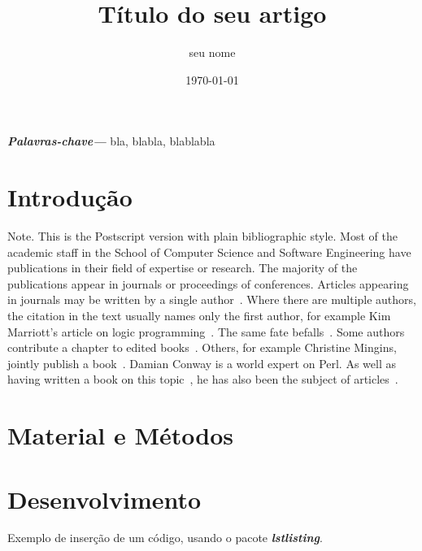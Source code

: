 \documentclass{article}
\title{Título do seu artigo}
\author{seu nome}
\date{\today}
\providecommand{\palavraschave}[1]{\textbf{\textit{\hspace{0.4cm}Palavras-chave---}} #1}
\begin{document}
\maketitle

\begin{abstract}
\noindent \lipsum[1-1]
\end{abstract}

\palavraschave{bla, blabla, blablabla}

%
\section{Introdução}
Note. This is the Postscript version with plain bibliographic style.
Most of the academic staff in the School of Computer Science and Software 
Engineering have publications in their field of expertise or research. 
The majority of the publications appear in journals or proceedings of conferences. 
Articles appearing in journals may be written by a single author~\cite{Meyer2000}. 
Where there are multiple authors, the citation in the text usually names only the first author, 
for example Kim Marriott's article on logic programming~\cite{Codishetal2000}. 
The same fate befalls~\cite{Huetal2000}. 
Some authors contribute a chapter to edited books~\cite{Conway2000}. Others, for example Christine Mingins, 
jointly publish a book~\cite{Huetal2000}. Damian Conway is a world expert on Perl. 
As well as having written a book on this topic~\cite{Conway2000}, 
he has also been the subject of articles~\cite{Meyer2000}.
%

\section{Material e Métodos}
\lipsum[1-3]
\section{Desenvolvimento}
\lipsum[1-1]
Exemplo de inserção de um código, usando o pacote \emph{\textbf{lstlisting}}.
\end{document}
